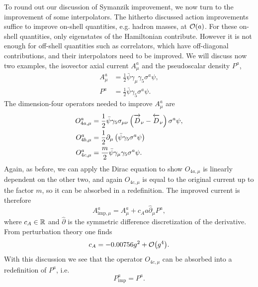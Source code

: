 To round out our discussion of Symanzik improvement, we now turn to the
improvement of some interpolators. The hitherto discussed action improvements
suffice to improve on-shell quantities, e.g. hadron masses, at $\order{a}$. 
For these on-shell quantities, only eigenstates of the Hamiltonian
contribute. However it is not enough for off-shell quantities such as
correlators, which have off-diagonal contributions, and their interpolators
need to be improved. We will discuss now two examples, the isovector axial
current $A_\mu^a$ and the pseudoscalar density $P^a$,
\begin{equation}\begin{aligned}
A_\mu^a&=\frac{1}{2}\bar{\psi}\gamma_\mu\gamma_5\sigma^a\psi,\\
P^a&=\frac{1}{2}\bar{\psi}\gamma_5\sigma^a\psi.
\end{aligned}\end{equation}
The dimension-four operators needed to improve $A_\mu^a$ are
\begin{equation}\begin{aligned}
  O_{4a,\mu}^a&=\frac{1}{2}\bar{\psi}\gamma_5\sigma_{\mu\nu}
                 \left(\overrightarrow{D\strut}_\nu-\overleftarrow{D\strut}_\nu\right)\sigma^a\psi,\\
  O_{4b,\mu}^a&=\frac{1}{2}\partial_\mu
                  \left(\bar{\psi}\gamma_5\sigma^a\psi\right)\\
  O_{4c,\mu}^a&=\frac{m}{2}\bar{\psi}\gamma_\mu\gamma_5\sigma^a\psi.
\end{aligned}\end{equation}
Again, as before, we can apply the Dirac equation to show $O_{4a,\mu}$ is
linearly dependent on the other two, and again $O_{4c,\mu}$ is equal to
the original current up to the factor $m$, so it can be absorbed
in a redefinition. The improved current is therefore
\begin{equation}
  A_{\text{imp},\mu}^a=A_\mu^a+c_A a\hat{\partial}_\mu P^a,
\end{equation}
where $c_A\in\mathbb{R}$ and $\hat{\partial}$ is the symmetric difference
discretization of the derivative. From perturbation theory one finds
\begin{equation}
  c_A=-0.00756g^2+\order{g^4}.
\end{equation}
With this discussion we see that the
operator $O_{4c,\mu}$ can be absorbed into a redefinition of $P^a$, i.e.
\begin{equation}
  P_\text{imp}^a=P^a.
\end{equation}

